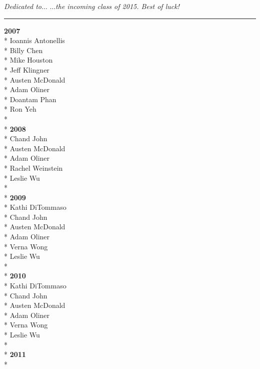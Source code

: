 \documentclass[10pt]{book}
\begin{document}
\thispagestyle{empty}
{\Large\it Dedicated to$\ldots$}
\vskip 0pt
{\it\hspace{.5in} $\ldots$the incoming class of 2015. Best of luck!}
\newpage

\mbox{}
\thispagestyle{empty}
\newpage

\vskip0pt
\rule[8pt]{\linewidth}{.5pt}
{\bf 2007}\\*
Ioannis Antonellis\\*
Billy Chen\\*
Mike Houston\\*
Jeff Klingner\\*
Austen McDonald\\*
Adam Oliner\\*
Doantam Phan\\*
Ron Yeh\\*
\vspace{0.2in}\\*
{\bf 2008}\\*
Chand John\\*
Austen McDonald\\*
Adam Oliner\\*
Rachel Weinstein\\*
Leslie Wu\\*
\vspace{0.2in}\\*
{\bf 2009}\\*
Kathi DiTommaso\\*
Chand John\\*
Austen McDonald\\*
Adam Oliner\\*
Verna Wong\\*
Leslie Wu\\*
\vspace{0.2in}\\*
{\bf 2010}\\*
Kathi DiTommaso\\*
Chand John\\*
Austen McDonald\\*
Adam Oliner\\*
Verna Wong\\*
Leslie Wu\\*
\vspace{0.2in}\\*
{\bf 2011}\\*
\end{document}
